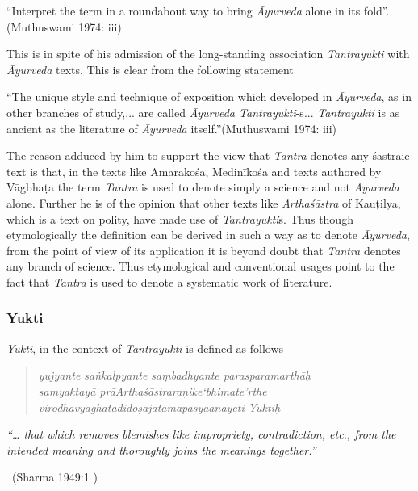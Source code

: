 \begin{myquote}
“Interpret the term in a roundabout way to bring \textit{Āyurveda} alone in its fold”.\hfill (Muthuswami 1974: iii)
\end{myquote}

This is in spite of his admission of the long-standing association \textit{Tantrayukti} with \textit{Āyurveda} texts. This is clear from the following statement 

“The unique style and technique of exposition which developed in \textit{Āyurveda}, as in other branches of study,... are called \textit{Āyurveda Tantrayukti}-s... \textit{Tantrayukti} is as ancient as the literature of \textit{Āyurveda} itself.”\hfill (Muthuswami 1974: iii)

The reason adduced by him to support the view that \textit{Tantra} denotes any śāstraic text is that, in the texts like Amarakośa, Medinīkośa and texts authored by Vāgbhaṭa the term \textit{Tantra} is used to denote simply a science and not \textit{Āyurveda} alone. Further he is of the opinion that other texts like \textit{Arthaśāstra} of Kauṭilya, which is a text on polity, have made use of \textit{Tantrayukti}s. Thus though etymologically the definition can be derived in such a way as to denote \textit{Āyurveda}, from the point of view of its application it is beyond doubt that \textit{Tantra} denotes any branch of science. Thus etymological and conventional usages point to the fact that \textit{Tantra} is used to denote a systematic work of literature.


\subsubsection*{Yukti}

\textit{Yukti}, in the context of \textit{Tantrayukti} is defined as follows -

\begin{verse}
\textit{yujyante saṅkalpyante saṃbadhyante parasparamarthāḥ}\\\textit{samyaktayā prāArthaśāstraraṇike‘bhimate’rthe}\\\textit{virodhavyāghātādidoṣajātamapāsyaanayeti Yuktiḥ}
\end{verse}

\begin{myquote}
\textit{“… that which removes blemishes like impropriety, contradiction, etc., from the intended meaning and thoroughly joins the meanings together.”}

~\hfill (Sharma 1949:1 )
\end{myquote}

